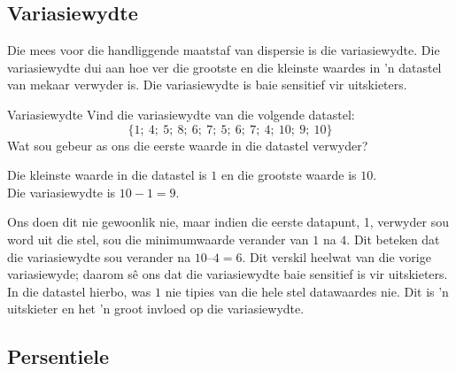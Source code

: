 \subsection{Variasiewydte}

Die mees voor die handliggende  maatstaf van dispersie is die variasiewydte. Die variasiewydte dui aan hoe ver die grootste en die kleinste waardes in ’n datastel van mekaar verwyder is. Die variasiewydte is baie sensitief vir uitskieters.

\begin{wex}{Variasiewydte}
{Vind die variasiewydte van die volgende datastel:
    \begin{equation*}
      \{1;\ 4;\ 5;\ 8;\ 6;\ 7;\ 5;\ 6;\ 7;\ 4;\ 10;\ 9;\ 10\}
    \end{equation*}
    Wat sou gebeur as ons die eerste waarde in die datastel verwyder?
}{
  Die kleinste waarde in die datastel is $1$ en die grootste waarde is $10$.\\
  Die variasiewydte is $10-1=9$.

  Ons doen dit nie gewoonlik nie, maar indien die eerste datapunt, 1, verwyder sou word uit die stel, sou die minimumwaarde verander van $1$ na $4$. Dit beteken dat die variasiewydte sou verander na $10 – 4 = 6$. Dit verskil heelwat van die vorige variasiewyde; daarom sê ons dat die variasiewydte baie sensitief is vir uitskieters. In die datastel hierbo, was $1$ nie tipies van die hele stel datawaardes nie. Dit is ’n uitskieter en het ’n groot invloed op die variasiewydte. 
}
\end{wex}


\subsection{Persentiele}


